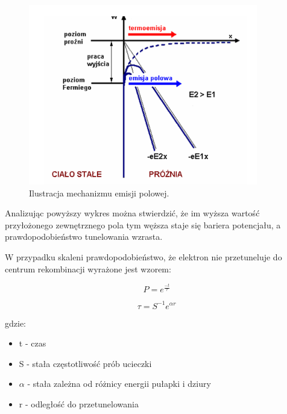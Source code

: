 \begin{figure}[H]
\centering
\includegraphics[width=10cm]{tunelowanie}
\caption{Ilustracja mechanizmu emisji polowej.}
\label{fig:Tunelowanie}
\end{figure}



Analizując powyższy wykres można stwierdzić, że im wyższa wartość przyłożonego zewnętrznego pola tym węższa staje się bariera potencjału, a prawdopodobieństwo tunelowania wzrasta. 

W przypadku skaleni prawdopodobieństwo, że elektron nie przetuneluje do centrum rekombinacji wyrażone jest wzorem:

\begin{equation}
P = e^{\frac{-t}{\tau}}
\end{equation}

\begin{equation}
\tau = S^{-1}e^{\alpha r}
\end{equation}


gdzie:
\begin{itemize}
\item t - czas
\item S - stała częstotliwość prób ucieczki
\item $\alpha$ -  stała zależna od różnicy energii pułapki i dziury
\item r - odległość do przetunelowania
\end{itemize}






